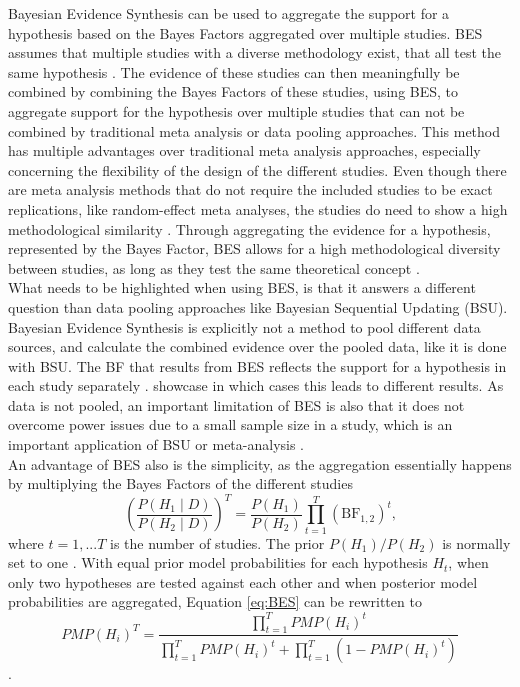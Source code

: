 \documentclass[12pt]{article}
\begin{document}
Bayesian Evidence Synthesis can be used to aggregate the support for a hypothesis based on the Bayes Factors aggregated over multiple studies. BES assumes that multiple studies with a diverse methodology exist, that all test the same hypothesis \citep{klugkist_bayesian_2023, kuiper_combining_2012}. The evidence of these studies can then meaningfully be combined by combining the Bayes Factors of these studies, using BES, to aggregate support for the hypothesis over multiple studies that can not be combined by traditional meta analysis or data pooling approaches. This method has multiple advantages over traditional meta analysis approaches, especially concerning the flexibility of the design of the different studies. Even though there are meta analysis methods that do not require the included studies to be exact replications, like random-effect meta analyses, the studies do need to show a high methodological similarity \citep{klugkist_bayesian_2023}. Through aggregating the evidence for a hypothesis, represented by the Bayes Factor, BES allows for a high methodological diversity between studies, as long as they test the same theoretical concept \citep{klugkist_bayesian_2023}. \\
What needs to be highlighted when using BES, is that it answers a different question than data pooling approaches like Bayesian Sequential Updating (BSU). Bayesian Evidence Synthesis is explicitly not a method to pool different data sources, and calculate the combined evidence over the pooled data, like it is done with BSU. The BF that results from BES reflects the support for a hypothesis in each study separately \citep{klugkist_bayesian_2023}. \cite{klugkist_bayesian_2023} showcase in which cases this leads to different results. As data is not pooled, an important limitation of BES is also that it does not overcome power issues due to a small sample size in a study, which is an important application of BSU or meta-analysis \citep{klugkist_bayesian_2023}. \\
An advantage of BES also is the simplicity, as the aggregation essentially happens by multiplying the Bayes Factors of the different studies 
\begin{equation}
    \label{eq:BES}
    \left(\frac{P\left(H_1 \mid D\right)}{P\left(H_2 \mid D\right)}\right)^T=\frac{P\left(H_1\right)}{P\left(H_2\right)} \prod_{t=1}^T\left(\mathrm{BF}_{1,2}\right)^t \text {,}
\end{equation}
where $t = 1, ... T$ is the number of studies. The prior $P(H_1)/P(H_2)$ is normally set to one \citep{klugkist_bayesian_2023}. With equal prior model probabilities for each hypothesis $H_t$, when only two hypotheses are tested against each other and when posterior model probabilities are aggregated, Equation \ref{eq:BES} can be rewritten to
\begin{equation}
    \label{eq:BESPMP}
    PMP\left(H_i\right)^T=\frac{\prod_{t=1}^T PMP\left(H_i\right)^t}{\prod_{t=1}^T PMP\left(H_i\right)^t+\prod_{t=1}^T\left(1-PMP\left(H_i\right)^t\right)}
\end{equation}
\citep{van_wonderen_bayesian_2024}.
\end{document}
